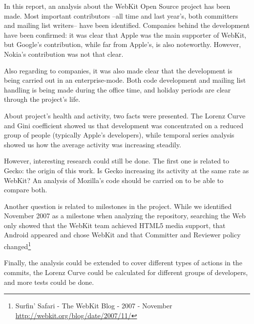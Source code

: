 In this report, an analysis about the WebKit Open Source project has been made. 
Most important contributors --all time and last year's, both committers and mailing list writers-- have been identified. Companies behind the development have been confirmed: it was clear that Apple was the main supporter of WebKit, but Google's contribution, while far from Apple's, is also noteworthy. However, Nokia's contribution was not that clear.

Also regarding to companies, it was also made clear that the development is being carried out in an enterprise-mode. Both code development and mailing list handling is being made during the office time, and holiday periods are clear through the project's life. 

About project's health and activity, two facts were presented. The Lorenz Curve and Gini coefficient showed us that development was concentrated on a reduced group of people (typically Apple's developers), while temporal series analysis showed us how the average activity was increasing steadily.

However, interesting research could still be done. The first one is related to Gecko: the origin of this work. Is Gecko increasing its activity at the same rate as WebKit? An analysis of Mozilla's code should be carried on to be able to compare both. 

Another question is related to milestones in the project. While we identified November 2007 as a milestone when analyzing the repository, searching the Web only showed that the WebKit team achieved HTML5 media support, that Android appeared and chose WebKit and that Committer and Reviewer policy changed\footnote{Surfin' Safari - The WebKit Blog - 2007 - November \url{http://webkit.org/blog/date/2007/11/}}

Finally, the analysis could be extended to cover different types of actions in the commits, the Lorenz Curve could be calculated for different groups of developers, and more tests could be done.

